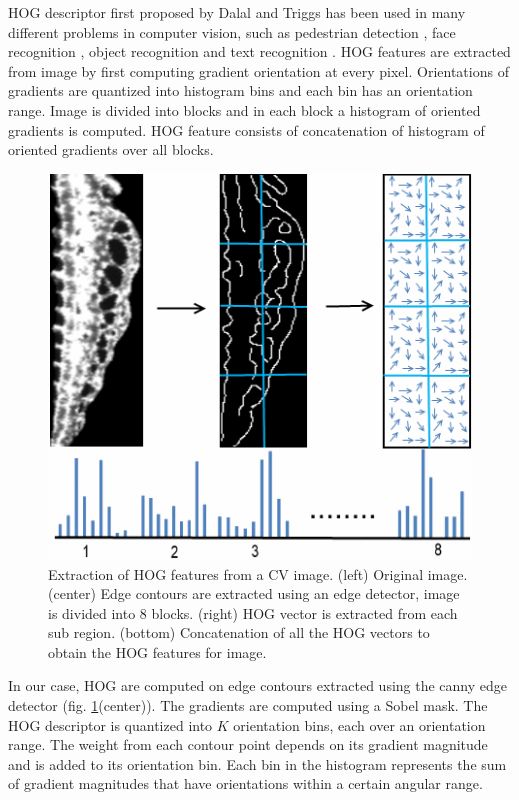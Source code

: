 HOG descriptor first proposed by Dalal and Triggs \cite{Dalal05} has been used in many different problems in computer vision, such as pedestrian detection \cite{Wada09}, face recognition \cite{Deniz11}, object recognition \cite{Bosch07} and text recognition \cite{Wang10}. HOG features are extracted from image by first computing gradient orientation at every pixel. Orientations of gradients are quantized into histogram bins and each bin has an orientation range. Image is divided into blocks and in each block a histogram of oriented gradients is computed. HOG feature consists of concatenation of histogram of oriented gradients over all blocks. 

\begin{figure}[htb] 
 \centering
\includegraphics[scale=0.75]{figure/hog.png}
  \caption[HOG features from a CV image]{Extraction of HOG features from a CV image. (left) Original image. (center) Edge contours are extracted using an edge detector, image is divided into 8 blocks. (right) HOG vector is extracted from each sub region. (bottom) Concatenation of all the HOG vectors to obtain the HOG features for image.}
 \label{hog}
\end{figure}

In our case, HOG are computed on edge contours extracted using the canny edge detector (fig. \ref{hog}(center)). The gradients are computed using a Sobel mask. The HOG descriptor is quantized into $K$ orientation bins, each over an orientation range. The weight from each contour point depends on its gradient magnitude and is added to its orientation bin. Each bin in the histogram represents the sum of gradient magnitudes that have orientations within a certain angular range. 

